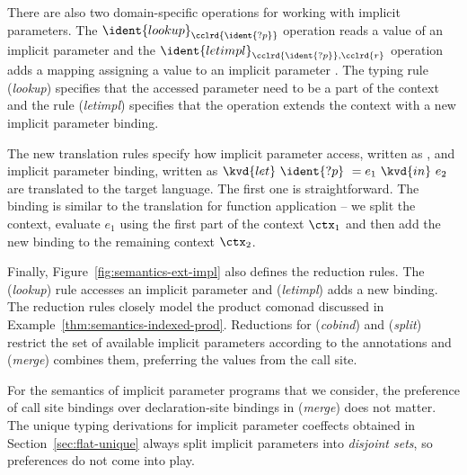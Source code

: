 There are also two domain-specific operations for working with implicit parameters. The
$\ident{lookup}_{\cclrd{\ident{?p}}}$ operation reads a value of an implicit parameter and
the $\ident{letimpl}_{\cclrd{\ident{?p}}, \cclrd{r}}$ operation adds a mapping assigning a value
to an implicit parameter . The typing rule (\emph{lookup}) specifies that the accessed
parameter need to be a part of the context and the rule (\emph{letimpl}) specifies that the
 operation extends the context with a new implicit parameter binding.

The new translation rules specify how implicit parameter access, written as , and
implicit parameter binding, written as $\kvd{let}~\ident{?p}~=e_1~\kvd{in}~e_2$ are translated to the
target language. The first one is straightforward. The binding is similar to the translation for
function application -- we split the context, evaluate $e_1$ using the first part of the context
$\ctx_1$ and then add the new binding to the remaining context $\ctx_2$.

Finally, Figure~\ref{fig:semantics-ext-impl} also defines the reduction rules. The (\emph{lookup})
rule accesses an implicit parameter and (\emph{letimpl}) adds a new binding. The reduction rules
closely model the product comonad discussed in Example~\ref{thm:semantics-indexed-prod}. Reductions
for (\emph{cobind}) and (\emph{split}) restrict the set of available implicit parameters according
to the annotations and (\emph{merge}) combines them, preferring the values from the call site.

For the semantics of implicit parameter programs that we consider, the preference of call site
bindings over declaration-site bindings in (\emph{merge}) does not matter. The unique typing
derivations for implicit parameter coeffects obtained in Section~\ref{sec:flat-unique} always
split implicit parameters into \emph{disjoint sets}, so preferences do not come into play.


